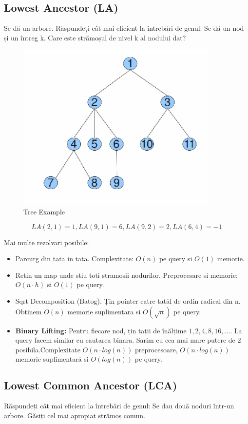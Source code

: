 \documentclass[11pt,a4paper]{article}
\theoremstyle{definition}
\theoremstyle{plain}
\theoremstyle{remark}
\begin{document}
\subsection{Lowest Ancestor (LA)}
Se dă un arbore. Răspundeți cât mai eficient la întrebări de genul: Se dă un nod și un întreg k. Care este strămoșul de nivel k al nodului dat?

\begin{figure}[H]
    \centering
    \includegraphics[width=0.45\linewidth]{lca-tree.png}
    \caption{Tree Example}
    \label{fig:enter-label}
\end{figure}

$$LA(2,1) = 1, LA(9,1) = 6, LA(9,2) = 2, LA(6,4) = -1$$

Mai multe rezolvari posibile:
\begin{itemize}
    \item Parcurg din tata in tata. Complexitate: $O(n)$ pe query si $O(1)$ memorie.
    \item Retin un map unde stiu toti stramosii nodurilor. Preprocesare si memorie: $O(n \cdot h)$ si $O(1)$ pe query.
    \item Sqrt Decomposition (Batog). Țin pointer catre tatăl de ordin radical din n. Obtinem $O(n)$ memorie suplimentara si $O(\sqrt{n})$ pe query.

    \item \textbf{Binary Lifting:} Pentru fiecare nod, țin tații de înălțime $1, 2, 4, 8, 16, …$. La query facem similar cu cautarea binara. Sarim cu cea mai mare putere de 2 posibila.Complexitate $O(n \cdot log(n))$ preprocesoare, $O(n\cdot log(n))$ memorie suplimentară si $O(log(n))$ pe query.
\end{itemize}

\subsection{Lowest Common Ancestor (LCA)}
Răspundeți cât mai eficient la întrebări de genul: Se dau două noduri într-un arbore. Găsiți cel mai apropiat strămoș comun.
\end{document}
